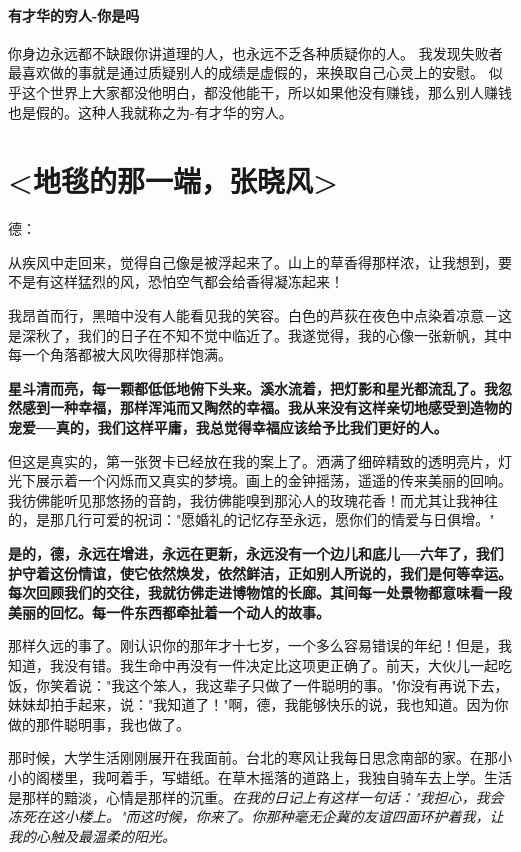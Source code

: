 \documentclass[UTF8,a4paper,8pt]{ctexart}
\begin{document}
 \paragraph{有才华的穷人-你是吗}
 你身边永远都不缺跟你讲道理的人，也永远不乏各种质疑你的人。 我发现失败者最喜欢做的事就是通过质疑别人的成绩是虚假的，来换取自己心灵上的安慰。 似乎这个世界上大家都没他明白，都没他能干，所以如果他没有赚钱，那么别人赚钱也是假的。这种人我就称之为-有才华的穷人。
 
 \newpage
 \section{<地毯的那一端，张晓风>}
 德：
 
 从疾风中走回来，觉得自己像是被浮起来了。山上的草香得那样浓，让我想到，要不是有这样猛烈的风，恐怕空气都会给香得凝冻起来！
 
 我昂首而行，黑暗中没有人能看见我的笑容。白色的芦荻在夜色中点染着凉意－这是深秋了，我们的日子在不知不觉中临近了。我遂觉得，我的心像一张新帆，其中每一个角落都被大风吹得那样饱满。
 
 \textbf{星斗清而亮，每一颗都低低地俯下头来。溪水流着，把灯影和星光都流乱了。我忽然感到一种幸福，那样浑沌而又陶然的幸福。我从来没有这样亲切地感受到造物的宠爱──真的，我们这样平庸，我总觉得幸福应该给予比我们更好的人。}
 
 但这是真实的，第一张贺卡已经放在我的案上了。洒满了细碎精致的透明亮片，灯光下展示着一个闪烁而又真实的梦境。画上的金钟摇荡，遥遥的传来美丽的回响。我彷佛能听见那悠扬的音韵，我彷佛能嗅到那沁人的玫瑰花香！而尤其让我神往的，是那几行可爱的祝词："愿婚礼的记忆存至永远，愿你们的情爱与日俱增。"
 
 \textbf{是的，德，永远在增进，永远在更新，永远没有一个边儿和底儿──六年了，我们护守着这份情谊，使它依然焕发，依然鲜洁，正如别人所说的，我们是何等幸运。每次回顾我们的交往，我就彷佛走进博物馆的长廊。其间每一处景物都意味看一段美丽的回忆。每一件东西都牵扯着一个动人的故事。}
 
 那样久远的事了。刚认识你的那年才十七岁，一个多么容易错误的年纪！但是，我知道，我没有错。我生命中再没有一件决定比这项更正确了。前天，大伙儿一起吃饭，你笑着说："我这个笨人，我这辈子只做了一件聪明的事。"你没有再说下去，妹妹却拍手起来，说："我知道了！"啊，德，我能够快乐的说，我也知道。因为你做的那件聪明事，我也做了。
 
 那时候，大学生活刚刚展开在我面前。台北的寒风让我每日思念南部的家。在那小小的阁楼里，我呵着手，写蜡纸。在草木摇落的道路上，我独自骑车去上学。生活是那样的黯淡，心情是那样的沉重。\textit{在我的日记上有这样一句话："我担心，我会冻死在这小楼上。"而这时候，你来了。你那种毫无企冀的友谊四面环护着我，让我的心触及最温柔的阳光。}
 
\end{document}
